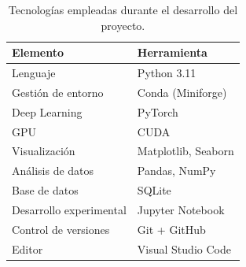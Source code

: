 \begin{table}[H]
\centering

\begin{tabular}{ll}

\toprule
Elemento & Herramienta \\
\midrule

Lenguaje & Python 3.11 \\
Gestión de entorno & Conda (Miniforge) \\
Deep Learning & PyTorch \\
GPU & CUDA \\
Visualización & Matplotlib, Seaborn \\
Análisis de datos & Pandas, NumPy \\
Base de datos & SQLite \\
Desarrollo experimental & Jupyter Notebook \\
Control de versiones & Git + GitHub \\
Editor & Visual Studio Code \\

\bottomrule

\end{tabular}

\caption{Tecnologías empleadas durante el desarrollo del proyecto.}

\end{table}
